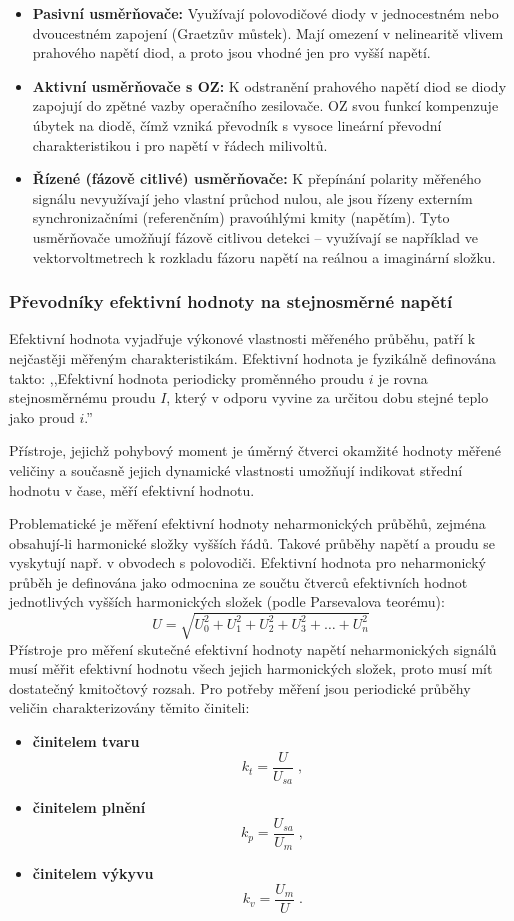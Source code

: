        \begin{itemize}
            \item \textbf{Pasivní usměrňovače:} Využívají polovodičové diody v jednocestném nebo dvoucestném zapojení (Graetzův můstek). Mají omezení v nelinearitě vlivem prahového napětí diod, a proto jsou vhodné jen pro vyšší napětí.
            \item \textbf{Aktivní usměrňovače s OZ:} K odstranění prahového napětí diod se diody zapojují do zpětné vazby operačního zesilovače. OZ svou funkcí kompenzuje úbytek na diodě, čímž vzniká převodník s vysoce lineární převodní charakteristikou i pro napětí v řádech milivoltů.
            \item \textbf{Řízené (fázově citlivé) usměrňovače:} K přepínání polarity měřeného signálu nevyužívají jeho vlastní průchod nulou, ale jsou řízeny externím synchronizačními (referenčním) pravoúhlými kmity (napětím). Tyto usměrňovače umožňují fázově citlivou detekci – využívají se například ve vektorvoltmetrech k rozkladu fázoru napětí na reálnou a imaginární složku.
        \end{itemize}
    \subsubsection{Převodníky efektivní hodnoty na stejnosměrné napětí}
        Efektivní hodnota vyjadřuje výkonové vlastnosti měřeného průběhu, patří k nejčastěji měřeným charakteristikám. Efektivní hodnota je fyzikálně definována takto: ,,Efektivní hodnota periodicky proměnného proudu $i$ je rovna stejnosměrnému proudu $I$, který v odporu vyvine za určitou dobu stejné teplo jako proud $i$.''

        Přístroje, jejichž pohybový moment je úměrný čtverci okamžité hodnoty měřené veličiny a současně jejich dynamické vlastnosti umožňují indikovat střední hodnotu v čase, měří efektivní hodnotu.
        
        Problematické je měření efektivní hodnoty neharmonických průběhů, zejména obsahují-li harmonické složky vyšších řádů. Takové průběhy napětí a proudu se vyskytují např. v obvodech s polovodiči. Efektivní hodnota pro neharmonický průběh je definována jako odmocnina ze součtu čtverců efektivních hodnot jednotlivých vyšších harmonických složek (podle Parsevalova teorému):
        $$U = \sqrt{U_0^2 + U_1^2 + U_2^2 + U_3^2 + \dots + U_n^2}$$
        Přístroje pro měření skutečné efektivní hodnoty napětí neharmonických signálů musí měřit efektivní hodnotu všech jejich harmonických složek, proto musí mít dostatečný kmitočtový rozsah. Pro potřeby měření jsou periodické průběhy veličin charakterizovány těmito činiteli:
        \begin{itemize}
            \item \textbf{činitelem tvaru} $$k_t = \frac{U}{U_{sa}} \;,$$
            \item \textbf{činitelem plnění} $$k_p = \frac{U_{sa}}{U_m} \;,$$
            \item \textbf{činitelem výkyvu} $$k_v = \frac{U_m}{U} \;.$$
        \end{itemize}
